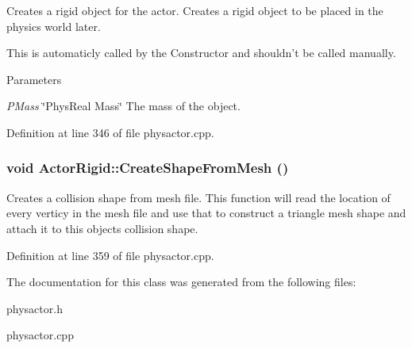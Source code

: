 Creates a rigid object for the actor. Creates a rigid object to be placed in the physics world later. \par
 This is automaticly called by the Constructor and shouldn't be called manually. 
\begin{DoxyParams}{Parameters}
\item[{\em PMass}]\char`\"{}PhysReal Mass\char`\"{} The mass of the object. \end{DoxyParams}


Definition at line 346 of file physactor.cpp.\hypertarget{classActorRigid_a1a1b7ca97c69bb5420a76116c388b3d1}{
\subsubsection[{CreateShapeFromMesh}]{\setlength{\rightskip}{0pt plus 5cm}void ActorRigid::CreateShapeFromMesh ()}}
\label{d5/d10/classActorRigid_a1a1b7ca97c69bb5420a76116c388b3d1}


Creates a collision shape from mesh file. This function will read the location of every verticy in the mesh file and use that to construct a triangle mesh shape and attach it to this objects collision shape. 

Definition at line 359 of file physactor.cpp.

The documentation for this class was generated from the following files:\begin{DoxyCompactItemize}
\item 
physactor.h\item 
physactor.cpp\end{DoxyCompactItemize}
